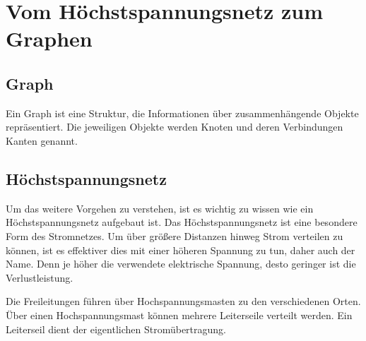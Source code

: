 
\chapter{Vom Höchstspannungsnetz zum Graphen}
\label{Kapitel 2}
%


\section{Graph}
\label{Graph}
%
Ein Graph ist eine Struktur, die Informationen über zusammenhängende Objekte repräsentiert. Die jeweiligen Objekte werden Knoten und deren Verbindungen Kanten genannt. 



\section{Höchstspannungsnetz}
\label{Kapitel_2_-_Unterkapitel_1}
%

Um das weitere Vorgehen zu verstehen, ist es wichtig zu wissen wie ein Höchstspannungsnetz aufgebaut ist. Das Höchstspannungsnetz ist eine besondere Form des Stromnetzes. Um über größere Distanzen hinweg Strom verteilen zu können, ist es effektiver dies mit einer höheren Spannung zu tun, daher auch der Name. Denn je höher die verwendete elektrische Spannung, desto geringer ist die Verlustleistung. 

Die Freileitungen führen über Hochspannungsmasten zu den verschiedenen Orten. Über einen Hochspannungsmast können mehrere Leiterseile verteilt werden. Ein Leiterseil dient der eigentlichen Stromübertragung.   


